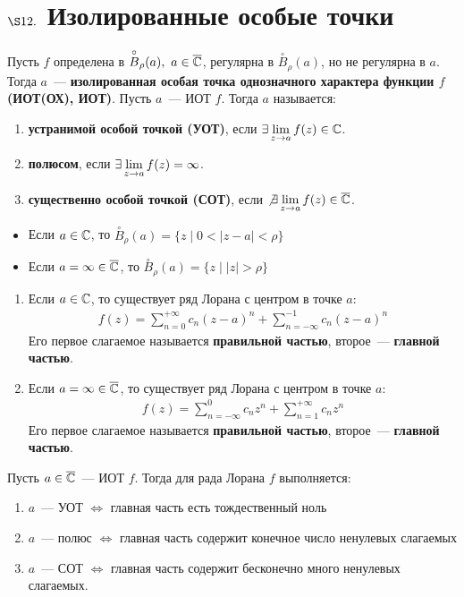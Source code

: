 \section{$\S 12.$ Изолированные особые точки}
\Def
Пусть $f$ определена в $\overset{\circ}{B}_\rho(a), \ a \in \overline{\mathbb{C}}$, регулярна в
$\overset{\circ}{B}_\rho(a)$, но не регулярна в $a$. Тогда $a$~---
\textbf{изолированная особая точка однозначного характера функции $f$ (ИОТ(ОХ),
  ИОТ)}.
\Def
Пусть $a$~--- ИОТ $f$. Тогда $a$ называется:
\begin{enumerate}
    \item \textbf{устранимой особой точкой (УОТ)}, если $\exists \displaystyle \lim_{z
      \to a} f(z) \in \mathbb{C}$.
    \item \textbf{полюсом}, если $\exists \displaystyle \lim_{z \to a}f(z) = \infty$.
    \item \textbf{существенно особой точкой (СОТ)}, если $\not \exists \displaystyle
    \lim_{z \to a} f(z) \in \overline{\mathbb{C}}$.
\end{enumerate}
\begin{itemize}
    \item Если $a \in \mathbb{C}$, то $\overset{\circ}{B}_\rho(a) = \{z \mid 0 < \left|
        z-a \right| < \rho\}$
    \item Если $a = \infty \in \overline{\mathbb{C}}$, то $\overset{\circ}{B}_\rho(a) = \{z \mid
    \left| z \right| > \rho\}$
\end{itemize}
\begin{enumerate}
    \item Если $a \in \mathbb{C}$, то существует ряд Лорана с центром в точке $a$:
    \begin{align*}
      f(z) = \sum_{n=0}^{+\infty}c_n(z-a)^n + \sum_{n=-\infty}^{-1} c_n(z-a)^n
    \end{align*}
    Его первое слагаемое называется \textbf{правильной частью}, второе~---
    \textbf{главной частью}.
    \item Если $a  = \infty \in \overline{\mathbb{C}}$, то существует ряд Лорана с центром в
    точке $a$:
    \begin{align*}
      f(z) = \sum_{n=-\infty}^{0}c_nz^n + \sum_{n=1}^{+\infty} c_nz^n
    \end{align*}
    Его первое слагаемое называется \textbf{правильной частью}, второе~---
    \textbf{главной частью}.
\end{enumerate}
\theorem
Пусть $a \in \overline{\mathbb{C}}$~--- ИОТ $f$. Тогда для рада Лорана $f$ выполняется:
\begin{enumerate}
    \item $a$~--- УОТ $\Leftrightarrow$ главная часть есть тождественный ноль
    \item $a$~--- полюс $\Leftrightarrow$ главная часть содержит конечное число
    ненулевых слагаемых
    \item $a$~--- СОТ $\Leftrightarrow$ главная часть содержит бесконечно много
    ненулевых слагаемых.
\end{enumerate}
